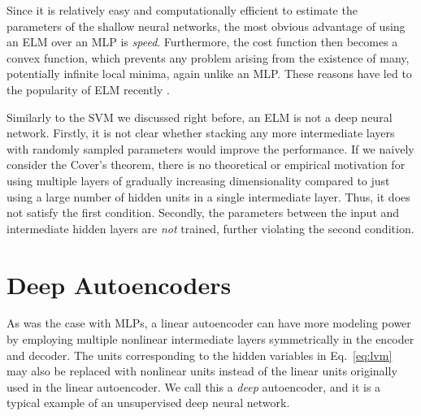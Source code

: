\documentclass[dissertation,nocontribution,draft*]{aaltoseries}
\begin{document}
Since it is relatively easy and computationally efficient to
estimate the parameters of the shallow neural networks, the
most obvious advantage of using an ELM over an MLP is
\textit{speed}. Furthermore, the cost function then
becomes a convex function, which prevents any problem
arising from the existence of many, potentially infinite
local minima, again unlike an MLP. These reasons have led
to the popularity of ELM recently \citep{Huang2011}.

Similarly to the SVM we discussed right before, an ELM is
not a deep neural network.  Firstly, it
is not clear whether stacking any more intermediate layers
with randomly sampled parameters would improve the
performance.  If we naively consider the Cover's theorem,
there is no theoretical or empirical motivation for using
multiple layers of gradually increasing dimensionality
compared to just using a large number of hidden units in a
single intermediate layer.  Thus, it does not satisfy the
first condition.  Secondly, the parameters between the input
and intermediate hidden layers are \textit{not} trained,
further violating the second condition.


\section{Deep Autoencoders}
\label{sec:autoencoders}

As was the case with MLPs, a linear autoencoder can have
more modeling power by employing multiple nonlinear
intermediate layers symmetrically in the encoder and
decoder. The units corresponding to the hidden variables in
Eq.~\eqref{eq:lvm} may also be replaced with nonlinear units
instead of the linear units originally used in the linear
autoencoder. We call this a \textit{deep} autoencoder, and
it is a typical example of an unsupervised deep neural
network.
\end{document}
